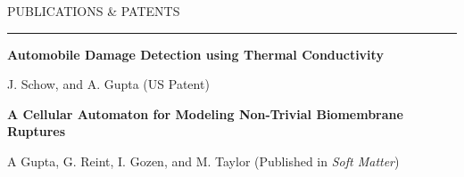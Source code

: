
{
\hspace{-1.72in}\noindent\color{cblue}
{PUBLICATIONS \& PATENTS} %
}

\vspace{-1.6ex}
{\hspace{-1.73in}\noindent\color{dblue}\rule{6.935in}{0.4pt}} %
\vspace{-2ex}

{\hspace{-1.76in}\fontsize{9}{1}
\textbf{Automobile Damage Detection using Thermal Conductivity}}

{\hspace{-1.76in}\fontsize{9}{1}
{\small J. Schow, and A. Gupta (US Patent)}
}

\vspace{1ex}

{\hspace{-1.76in}\fontsize{9}{1}
\textbf{A Cellular Automaton for Modeling Non-Trivial Biomembrane Ruptures}
}

{\hspace{-1.76in}\fontsize{9}{1} 
{\small A Gupta, G. Reint, I. Gozen, and M. Taylor (Published in \textit{Soft Matter})}}

\vspace{-1ex}

